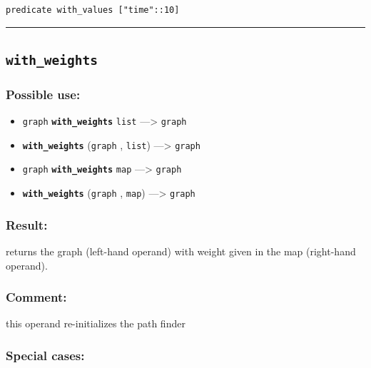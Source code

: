 \documentclass[]{book}
\providecommand{\tightlist}{%
  \setlength{\itemsep}{0pt}\setlength{\parskip}{0pt}}
\theoremstyle{definition}
\theoremstyle{definition}
\theoremstyle{definition}
\theoremstyle{remark}
\begin{document}
\begin{verbatim}
predicate with_values ["time"::10] 
\end{verbatim}

\begin{center}\rule{0.5\linewidth}{\linethickness}\end{center}

\subsection{\texorpdfstring{\texttt{with\_weights}}{with\_weights}}\label{with_weights}

\subsubsection{Possible use:}\label{possible-use-562}

\begin{itemize}
\tightlist
\item
  \texttt{graph} \textbf{\texttt{with\_weights}} \texttt{list}
  ---\textgreater{} \texttt{graph}
\item
  \textbf{\texttt{with\_weights}} (\texttt{graph} , \texttt{list})
  ---\textgreater{} \texttt{graph}
\item
  \texttt{graph} \textbf{\texttt{with\_weights}} \texttt{map}
  ---\textgreater{} \texttt{graph}
\item
  \textbf{\texttt{with\_weights}} (\texttt{graph} , \texttt{map})
  ---\textgreater{} \texttt{graph}
\end{itemize}

\subsubsection{Result:}\label{result-541}

returns the graph (left-hand operand) with weight given in the map
(right-hand operand).

\subsubsection{Comment:}\label{comment-112}

this operand re-initializes the path finder

\subsubsection{Special cases:}\label{special-cases-149}
\end{document}
